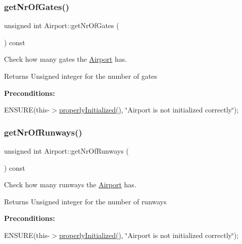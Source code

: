 \subsubsection{\texorpdfstring{get\+Nr\+Of\+Gates()}{getNrOfGates()}}
{\footnotesize\ttfamily unsigned int Airport\+::get\+Nr\+Of\+Gates (\begin{DoxyParamCaption}{ }\end{DoxyParamCaption}) const}



Check how many gates the \mbox{\hyperlink{class_airport}{Airport}} has. 

\begin{DoxyReturn}{Returns}
Unsigned integer for the number of gates
\end{DoxyReturn}
{\bfseries Preconditions\+:}
\begin{DoxyItemize}
\item E\+N\+S\+U\+RE(this-\/$>$\mbox{\hyperlink{class_airport_aa13e68ac58e8875837fbe888325cfff6}{properly\+Initialized()}}, \char`\"{}\+Airport is not initialized correctly\char`\"{}); 
\end{DoxyItemize}\mbox{\label{class_airport_ae65f2bbf4060d54a3c282f18928790a0}} 
\subsubsection{\texorpdfstring{get\+Nr\+Of\+Runways()}{getNrOfRunways()}}
{\footnotesize\ttfamily unsigned int Airport\+::get\+Nr\+Of\+Runways (\begin{DoxyParamCaption}{ }\end{DoxyParamCaption}) const}



Check how many runways the \mbox{\hyperlink{class_airport}{Airport}} has. 

\begin{DoxyReturn}{Returns}
Unsigned integer for the number of runways
\end{DoxyReturn}
{\bfseries Preconditions\+:}
\begin{DoxyItemize}
\item E\+N\+S\+U\+RE(this-\/$>$\mbox{\hyperlink{class_airport_aa13e68ac58e8875837fbe888325cfff6}{properly\+Initialized()}}, \char`\"{}\+Airport is not initialized correctly\char`\"{}); 
\end{DoxyItemize}\mbox{\label{class_airport_a1d7b9530df732ebee79ce0f1de7616e2}} 
